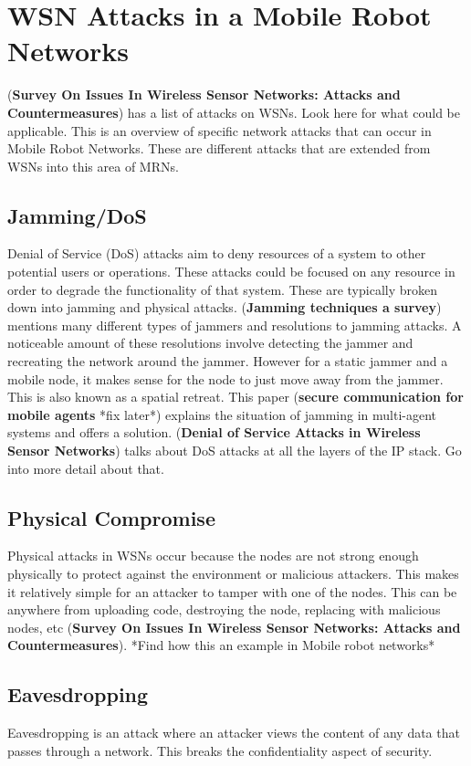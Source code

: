 \section{WSN Attacks in a Mobile Robot Networks}
(\textbf{Survey On Issues In Wireless Sensor Networks: Attacks and Countermeasures}) has a list of attacks on WSNs. Look here for what could be applicable. \newline
This is an overview of specific network attacks that can occur in Mobile Robot Networks. These are different attacks that are extended from WSNs into this area of MRNs.
\subsection{Jamming/DoS}
Denial of Service (DoS) attacks aim to deny resources of a system to other potential users or operations. These attacks could be focused on any resource in order to degrade the functionality of that system. These are typically broken down into jamming and physical attacks. \newline
(\textbf{Jamming techniques a survey}) mentions many different types of jammers and resolutions to jamming attacks. A noticeable amount of these resolutions involve detecting the jammer and recreating the network around the jammer. However for a static jammer and a mobile node, it makes sense for the node to just move away from the jammer. This is also known as a spatial retreat. This paper (\textbf{secure communication for mobile agents} *fix later*) explains the situation of jamming in multi-agent systems and offers a solution. \newline
(\textbf{Denial of Service Attacks in Wireless Sensor Networks}) talks about DoS attacks at all the layers of the IP stack. Go into more detail about that. 
\subsection{Physical Compromise}
Physical attacks in WSNs occur because the nodes are not strong enough physically to protect against the environment or malicious attackers. This makes it relatively simple for an attacker to tamper with one of the nodes. This can be anywhere from uploading code, destroying the node, replacing with malicious nodes, etc (\textbf{Survey On Issues In Wireless Sensor Networks: Attacks and Countermeasures}). *Find how this an example in Mobile robot networks* 
\subsection{Eavesdropping}
Eavesdropping is an attack where an attacker views the content of any data that passes through a network. This breaks the confidentiality aspect of security. 
